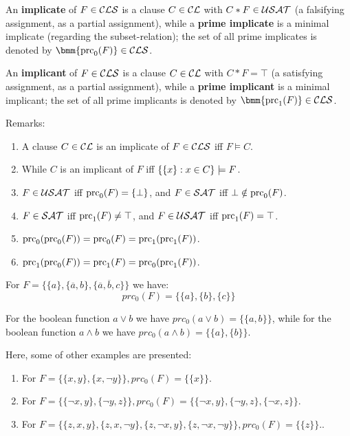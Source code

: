 \documentclass[12pt]{book}
\begin{document}
\begin{defi}\label{def:primec}
  An \textbf{implicate} of $F \in \mathcal{CLS}$ is a clause $C \in \mathcal{CL}$ with $C* F \in \mathcal{USAT}$ (a falsifying assignment, as a partial assignment), while a \textbf{prime implicate} is a minimal implicate (regarding the subset-relation); the set of all prime implicates is denoted by $\bmm{\primec_0(F)} \in \Cls$.

  An \textbf{implicant} of $F \in \mathcal{CLS}$ is a clause $C \in \mathcal{CL}$ with $C * F = \top$ (a satisfying assignment, as a partial assignment), while a \textbf{prime implicant} is a minimal implicant; the set of all prime implicants is denoted by $\bmm{\primec_1(F)} \in \Cls$.
\end{defi}
Remarks:
\begin{enumerate}
\item A clause $C \in \mathcal{CL}$ is an implicate of $F \in \mathcal{CLS}$ iff $F \models C$.
\item While $C$ is an implicant of $F$ iff $\{ \{ x \} :x \in C \} \models F$.
\item $F \in \mathcal{USAT}$ iff $\operatorname{prc}_0(F) = \{ \bot \}$, and $F \in \mathcal{SAT}$ iff $\bot \notin \operatorname{prc}_0(F)$.
\item $F \in \mathcal{SAT}$ iff $\operatorname{prc}_1(F) \ne \top$, and $F \in \mathcal{USAT}$ iff $\operatorname{prc}_1(F) = \top$.
\item $\operatorname{prc}_0(\operatorname{prc}_0(F)) = \operatorname{prc}_0(F) = \operatorname{prc}_1(\operatorname{prc}_1(F))$.
\item $\operatorname{prc}_1(\operatorname{prc}_0(F)) = \operatorname{prc}_1(F) = \operatorname{prc}_0(\operatorname{prc}_1(F))$.
\end{enumerate}

\begin{examp}\label{exp:aaa}
      For $F = \{ \{a\}, \{ \overline a, b \}, \{ \overline a, \overline b, c \} \}$ we have:
      $$ prc_0(F) = \{ \{a\}, \{ b \}, \{ c \} \} $$
\end{examp}

\begin{examp}\label{exp:imp3}
      For the boolean function $ a \vee b$ we have $prc_0(a \vee b) = \{ \{a, b \} \}$, while for the boolean function 
	  $a \wedge b$ we have $prc_0(a \wedge b) = \{ \{ a \}, \{b\}\}$.
\end{examp}

\begin{examp}\label{exp:bbb}
      Here, some of other examples are presented:
	  \begin{enumerate}
	        \item For $F = \{\{x, y\} , \{x,\neg y\}\}, prc_0(F) = \{\{x\}\}$.
			\item For $F = \{\{ \neg x, y\} , \{ \neg y, z\}\}, prc_0(F) = \{\{\neg x, y\} , \{\neg y, z\} , \{\neg x, z\}\}$.
			\item For $F = \{\{z, x, y\} , \{z, x, \neg y\} , \{z, \neg x, y\} , \{z,\neg x, \neg y\}\}, prc_0(F) = \{\{z\}\}.$.
      \end{enumerate}
\end{examp}
\end{document}
